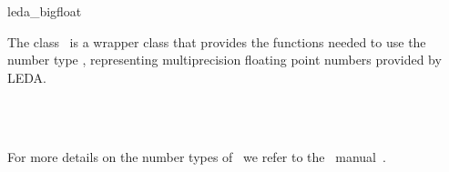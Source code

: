 \ccDefGlobalScope{}
\begin{ccRefClass}{leda_bigfloat}

\ccDefinition

The class \ccRefName\ is a wrapper class that provides the functions needed to
use the number type , representing multiprecision
floating point numbers provided by {\sc LEDA}. 


\ccIsModel
{}\\
\\

For more details on the number types of \leda\ we refer to the \leda\
manual~\cite{cgal:mnsu-lum}.

\end{ccRefClass}
